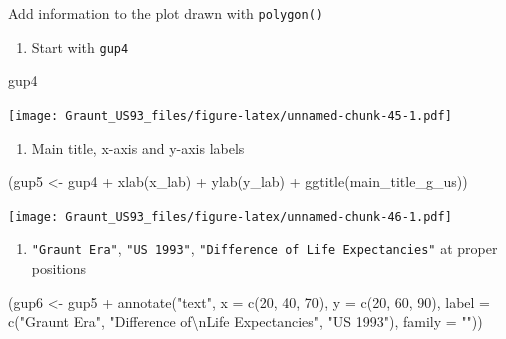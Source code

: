 \documentclass[
]{article}
\newenvironment{Shaded}{\begin{snugshade}}{\end{snugshade}}
\newcommand{\AttributeTok}[1]{\textcolor[rgb]{0.77,0.63,0.00}{#1}}
\newcommand{\DecValTok}[1]{\textcolor[rgb]{0.00,0.00,0.81}{#1}}
\newcommand{\FunctionTok}[1]{\textcolor[rgb]{0.00,0.00,0.00}{#1}}
\newcommand{\NormalTok}[1]{#1}
\newcommand{\OtherTok}[1]{\textcolor[rgb]{0.56,0.35,0.01}{#1}}
\newcommand{\SpecialCharTok}[1]{\textcolor[rgb]{0.00,0.00,0.00}{#1}}
\newcommand{\StringTok}[1]{\textcolor[rgb]{0.31,0.60,0.02}{#1}}
\providecommand{\tightlist}{%
  \setlength{\itemsep}{0pt}\setlength{\parskip}{0pt}}
\begin{document}
Add information to the plot drawn with \texttt{polygon()}

\begin{enumerate}
\def\labelenumi{\arabic{enumi}.}
\tightlist
\item
  Start with \texttt{gup4}
\end{enumerate}

\begin{Shaded}
\begin{Highlighting}[]
\NormalTok{gup4}
\end{Highlighting}
\end{Shaded}

\texttt{[image: Graunt\_US93\_files/figure-latex/unnamed-chunk-45-1.pdf]}

\begin{enumerate}
\def\labelenumi{\arabic{enumi}.}
\setcounter{enumi}{1}
\tightlist
\item
  Main title, x-axis and y-axis labels
\end{enumerate}

\begin{Shaded}
\begin{Highlighting}[]
\NormalTok{(gup5 }\OtherTok{\textless{}{-}}\NormalTok{ gup4 }\SpecialCharTok{+} 
   \FunctionTok{xlab}\NormalTok{(x\_lab) }\SpecialCharTok{+} 
   \FunctionTok{ylab}\NormalTok{(y\_lab) }\SpecialCharTok{+}
   \FunctionTok{ggtitle}\NormalTok{(main\_title\_g\_us))}
\end{Highlighting}
\end{Shaded}

\texttt{[image: Graunt\_US93\_files/figure-latex/unnamed-chunk-46-1.pdf]}

\begin{enumerate}
\def\labelenumi{\arabic{enumi}.}
\setcounter{enumi}{2}
\tightlist
\item
  \texttt{"Graunt\ Era"}, \texttt{"US\ 1993"},
  \texttt{"Difference\ of\ Life\ Expectancies"} at proper positions
\end{enumerate}

\begin{Shaded}
\begin{Highlighting}[]
\NormalTok{(gup6 }\OtherTok{\textless{}{-}}\NormalTok{ gup5 }\SpecialCharTok{+} 
   \FunctionTok{annotate}\NormalTok{(}\StringTok{"text"}\NormalTok{, }
            \AttributeTok{x =} \FunctionTok{c}\NormalTok{(}\DecValTok{20}\NormalTok{, }\DecValTok{40}\NormalTok{, }\DecValTok{70}\NormalTok{), }\AttributeTok{y =} \FunctionTok{c}\NormalTok{(}\DecValTok{20}\NormalTok{, }\DecValTok{60}\NormalTok{, }\DecValTok{90}\NormalTok{), }
            \AttributeTok{label =} \FunctionTok{c}\NormalTok{(}\StringTok{"Graunt Era"}\NormalTok{, }\StringTok{"Difference of}\SpecialCharTok{\textbackslash{}n}\StringTok{Life Expectancies"}\NormalTok{, }\StringTok{"US 1993"}\NormalTok{), }
            \AttributeTok{family =} \StringTok{""}\NormalTok{))}
\end{Highlighting}
\end{Shaded}
\end{document}
